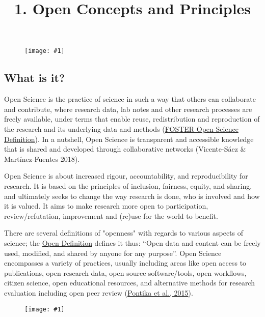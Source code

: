 \documentclass{article}
\newlength{\imgwidth}
\newcommand\scaledgraphics[2]{%
                
\settowidth{\imgwidth}{\texttt{[image: \#1]}}%
                
\setlength{\imgwidth}{\minof{\imgwidth}{#2\textwidth}}%
                
\texttt{[image: \#1]}%
                
}
\begin{document}
\title{1. Open Concepts and Principles}

\maketitle

\begin{figure}
\scaledgraphics{10b2f781-2abf-4be1-bbb2-8d7171c1ad64.png}{1}
\label{F80917671}
\end{figure}


\subsection{What is it?}\label{what-is-it}



Open Science is the practice of science in such a way that others can collaborate and contribute, where research data, lab notes and other research processes are freely available, under terms that enable reuse, redistribution and reproduction of the research and its underlying data and methods (\href{https://www.fosteropenscience.eu/foster-taxonomy/open-science-definition}{FOSTER Open Science Definition}). In a nutshell, Open Science is transparent and accessible knowledge that is shared and developed through collaborative networks (Vicente-Sáez \& Martínez-Fuentes 2018).


Open Science is about increased rigour, accountability, and reproducibility for research. It is based on the principles of inclusion, fairness, equity, and sharing, and ultimately seeks to change the way research is done, who is involved and how it is valued. It aims to make research more open to participation, review/refutation, improvement and (re)use for the world to benefit.


There are several definitions of "openness" with regards to various aspects of science; the \href{http://opendefinition.org/}{Open Definition} defines it thus: “Open data and content can be freely used, modified, and shared by anyone for any purpose”. Open Science encompasses a variety of practices, usually including areas like open access to publications, open research data, open source software/tools, open workflows, citizen science, open educational resources, and alternative methods for research evaluation including open peer review (\href{https://f1000research.com/articles/6-588/v2#ref-59}{Pontika et al., 2015}).

\begin{figure}
\scaledgraphics{abc115ff-ca30-47ae-93b3-21481e792c0d.png}{1}
\label{F73706771}
\end{figure}
\end{document}
